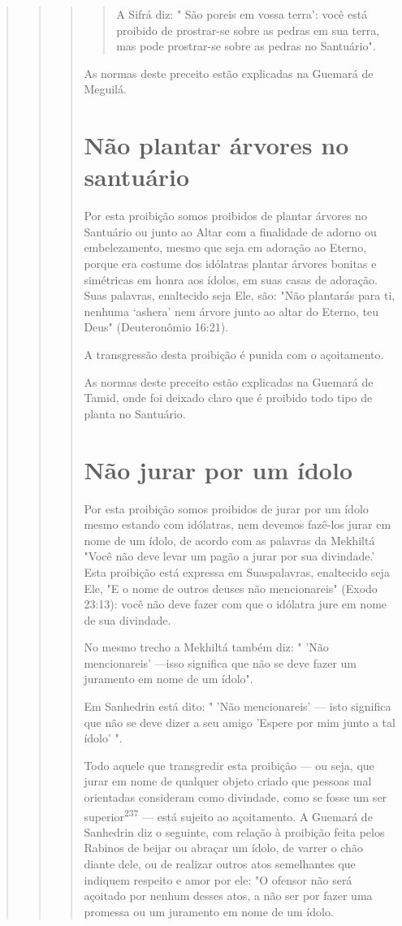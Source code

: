\begin{quote}
\begin{quote}
\begin{quote}
\begin{quote}
A Sifrá diz: " São poreis em vossa terra': você está proibido de
prostrar-se sobre as pedras em sua terra, mas pode prostrar-se sobre as
pedras no Santuário".
\end{quote}

As normas deste preceito estão explicadas na Guemará de Meguilá.

\section{Não plantar árvores no santuário}

Por esta proibição somos proibidos de plantar árvores no Santuário ou
junto ao Altar com a finalidade de adorno ou embelezamento, mesmo que
seja em adoração ao Eterno, porque era costume dos idólatras plantar
árvores bonitas e simétricas em honra aos ídolos, em suas casas de
adoração. Suas pala­vras, enaltecido seja Ele, são: "Não plantarás para
ti, nenhuma `ashera' nem ár­vore junto ao altar do Eterno, teu Deus"
(Deuteronômio 16:21).

A transgressão desta proibição é punida com o açoitamento.

As normas deste preceito estão explicadas na Guemará de Tamid, onde foi
deixado claro que é proibido todo tipo de planta no Santuário.

\section{Não jurar por um ídolo}

Por esta proibição somos proibidos de jurar por um ídolo mesmo estando
com idólatras, nem devemos fazê-los jurar em nome de um ídolo, de acordo
com as palavras da Mekhiltá "Você não deve levar um pagão a jurar por
sua divindade.' Esta proibição está expressa em Suaspalavras, enaltecido
seja Ele, "E o nome de outros deuses não mencionareis" (Exodo 23:13):
você não deve fazer com que o idólatra jure em nome de sua divindade.

No mesmo trecho a Mekhiltá também diz: " 'Não mencionareis' ---isso
significa que não se deve fazer um juramento em nome de um ídolo".

Em Sanhedrin está dito: " 'Não mencionareis' --- isto significa que não
se deve dizer a seu amigo 'Espere por mim junto a tal ídolo' ".

Todo aquele que transgredir esta proibição --- ou seja, que jurar em
nome de qualquer objeto criado que pessoas mal orientadas consideram
como divindade, como se fosse um ser superior\textsuperscript{237} ---
está sujeito ao açoitamento. A Guemará de Sanhedrin diz o seguinte, com
relação à proibição feita pelos Rabi­nos de beijar ou abraçar um ídolo,
de varrer o chão diante dele, ou de realizar outros atos semelhantes que
indiquem respeito e amor por ele: "O ofensor não será açoitado por
nenhum desses atos, a não ser por fazer uma promessa ou um juramento em
nome de um ídolo.
\end{quote}


\end{quote}
\end{quote}
